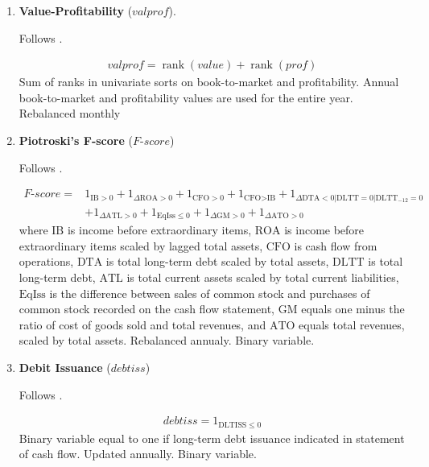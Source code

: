 \begin{enumerate}
	\item \textbf{Value-Profitability} ($valprof$).
	
	Follows . 
	
	\begin{align*}
		valprof = \operatorname{rank}(value) + \operatorname{rank}(prof)
	\end{align*}
	Sum of ranks in univariate sorts on book-to-market and profitability. Annual book-to-market and profitability values are used for the entire year. Rebalanced monthly
	
	
	
	\item \textbf{Piotroski's F-score} ($F$-$score$)
	
	Follows . 
	
	\begin{align*}
		F\text{-}score = & 1_{\text{IB}>0} + 1_{\Delta \text{ROA}>0} + 1_{\text{CFO}>0} + 1_{\text{CFO}>\text{IB}} + 1_{\Delta \text{DTA}<0 | \text{DLTT}=0 | \text{DLTT}_{-12}=0} \\
		& + 1_{\Delta \text{ATL}>0} + 1_{\text{EqIss} \leq 0} + 1_{\Delta \text{GM}>0} + 1_{\Delta \text{ATO}>0}
	\end{align*}
	where $\mathrm{IB}$ is income before extraordinary items, $\mathrm{ROA}$ is income before extraordinary items scaled by lagged total assets, $\mathrm{CFO}$ is cash flow from operations, $\mathrm{DTA}$ is total long-term debt scaled by total assets, $\mathrm{DLTT}$ is total long-term debt, $\mathrm{ATL}$ is total current assets scaled by total current liabilities, $\mathrm{EqIss}$ is the difference between sales of common stock and purchases of common stock recorded on the cash flow statement, $\mathrm{GM}$ equals one minus the ratio of cost of goods sold and total revenues, and $\mathrm{ATO}$ equals total revenues, scaled by total assets. Rebalanced annualy. Binary variable.
	
	
	
	\item \textbf{Debit Issuance} ($debtiss$)
	
	Follows . 
	
	\begin{align*}
		debtiss = 1_{\text{DLTISS} \leq 0}
	\end{align*}
	Binary variable equal to one if long-term debt issuance indicated in statement of cash flow. Updated annually. Binary variable.
	
	
	

\end{enumerate}
